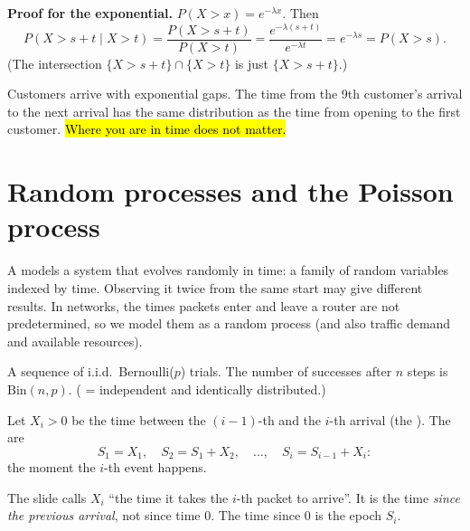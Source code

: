 \textbf{Proof for the exponential.} $P(X>x)=e^{-\lambda x}$. Then
\[ P(X>s+t\mid X>t)=\frac{P(X>s+t)}{P(X>t)}=\frac{e^{-\lambda(s+t)}}{e^{-\lambda t}}=e^{-\lambda s}=P(X>s). \]
(The intersection $\{X>s+t\}\cap\{X>t\}$ is just $\{X>s+t\}$.)

\begin{example}[Customers]
Customers arrive with exponential gaps. The time from the 9th customer's arrival to the next arrival has the same distribution as the time from opening to the first customer.
\hl{Where you are in time does not matter.}
\end{example}

\section{Random processes and the Poisson process}

\begin{defn}
A  models a system that evolves randomly in time: a family of random variables indexed by time. Observing it twice from the same start
may give different results. In networks, the times packets enter and leave a router are not predetermined, so we model them as a random process
(and also traffic demand and available resources).
\end{defn}

\begin{example}
A sequence of i.i.d.\ Bernoulli($p$) trials. The number of successes after $n$ steps is $\text{Bin}(n,p)$.
( = independent and identically distributed.)
\end{example}

\begin{defn}
Let $X_i>0$ be the time between the $(i-1)$-th and the $i$-th arrival (the ). The  are
\[ S_1=X_1,\quad S_2=S_1+X_2,\quad\dots,\quad S_i=S_{i-1}+X_i: \]
the moment the $i$-th event happens.
\end{defn}

\begin{pitfall}
The slide calls $X_i$ ``the time it takes the $i$-th packet to arrive''. It is the time \emph{since the previous arrival}, not since time $0$.
The time since $0$ is the epoch $S_i$.
\end{pitfall}

